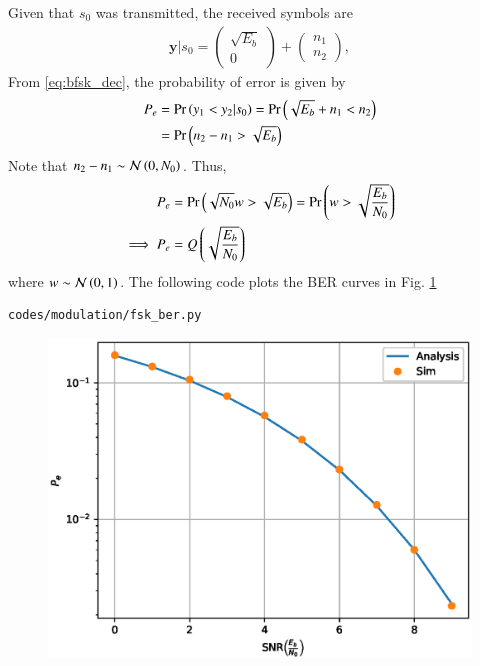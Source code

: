 \begin{enumerate}[label=\arabic*.,ref=\thesubsection.\theenumi]
\solution Given that $s_0$ was transmitted, the received symbols are
\begin{align}
\mathbf{y}|s_0 = 
\begin{pmatrix*}
\sqrt{E_b} \\
0
\end{pmatrix*}
+
\begin{pmatrix*}
 n_{1}\\
n_{2}
\end{pmatrix*},
\end{align}
From \eqref{eq:bfsk_dec}, 
the probability of error is given by
\begin{align}
P_e &= \Pr\left(y_1 < y_2|s_0\right) = \Pr\left(\sqrt{E_b} + n_1 < n_2\right)
\\
&= \Pr\left( n_2-n_1 > \sqrt{E_b} \right) 
\label{eq:bfsk_proof_n0}
\end{align}
Note that $n_2-n_1 \sim \mathcal{N}\left(0,N_0\right)$. Thus, 
\begin{align}
P_e &= \Pr\left( \sqrt{N_0}w > \sqrt{E_b} \right)  =  \Pr\left( w > \sqrt{\frac{E_b}{N_0}} \right)
\\
\implies 
P_e & = Q\left(\sqrt{\frac{E_b}{N_0}}\right)
\end{align}
where 
$w \sim \mathcal{N}\left(0,1\right)$.  
%
The following code plots the BER curves in Fig. \ref{fig:bfsk_ber}
\begin{lstlisting}
codes/modulation/fsk_ber.py
\end{lstlisting}
%
\begin{figure}[!h]
\centering
\includegraphics[width=\columnwidth]{./modulation/manual/figs/bfsk_ber.eps}
\caption{}
\label{fig:bfsk_ber}
\end{figure}
\end{enumerate}

